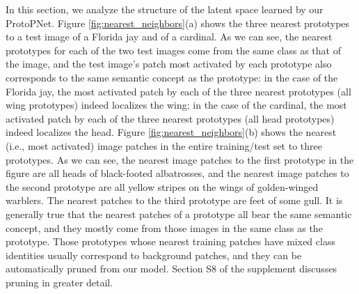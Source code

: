 \documentclass{article}
\theoremstyle{definition}
\theoremstyle{remark}
\begin{document}
In this section, we analyze the structure of the latent space learned by our ProtoPNet.
Figure \ref{fig:nearest_neighbors}(a) shows the three nearest prototypes to a test image of a Florida jay and of a cardinal.
As we can see, the nearest prototypes for each of the two test images come from the same class as that of the image, and the test image's patch most activated by each prototype also corresponds to the same semantic concept as the prototype: in the case of the Florida jay, the most activated patch by each of the three nearest prototypes (all wing prototypes) indeed localizes the wing;
in the case of the cardinal, the most activated patch by each of the three nearest prototypes (all head prototypes) indeed localizes the head.
Figure \ref{fig:nearest_neighbors}(b) shows the nearest (i.e., most activated) image patches in the entire training/test set to three prototypes. As we can see, the nearest image patches to the first prototype in the figure are all heads of black-footed albatrosses, and the nearest image patches to the second prototype are all yellow stripes on the wings of golden-winged warblers. The nearest patches to the third prototype are feet of some gull. It is generally true that the nearest patches of a prototype all bear the same semantic concept, and they mostly come from those images in the same class as the prototype. Those prototypes whose nearest training patches have mixed class identities usually correspond to background patches, and they can be automatically pruned from our model. Section S8 of the supplement discusses pruning in greater detail.

\end{document}
